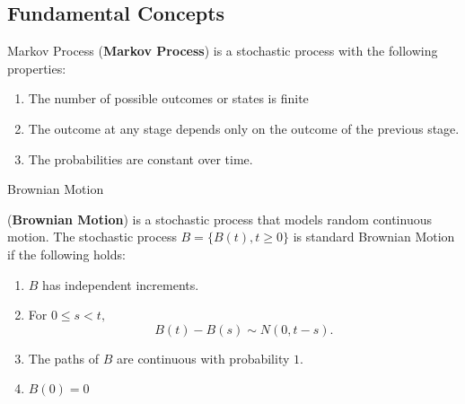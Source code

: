 \subsection{Fundamental Concepts}
%
\begin{frame}{Markov Process}
(\textbf{Markov Process}) is a stochastic process with the following properties: 
\begin{enumerate}
\item The number of possible outcomes or states is finite
\item The outcome at any stage depends only on the outcome of the previous stage.
\item The probabilities are constant over time.   
\end{enumerate}
\end{frame}


\begin{frame}{Brownian Motion}
\begin{definition}(\textbf{Brownian Motion}) is a stochastic process that models random continuous motion. The stochastic process $B=\{B(t), t\geq 0\}$ is standard Brownian Motion if the following holds:
\begin{enumerate}
\item $B$ has independent increments.
\item For $0 \leq s < t,$ $$B(t)-B(s) \sim N(0,t-s).$$
\item The paths of $B$ are continuous with probability $1$.
\item $B(0)=0$ 
\end{enumerate}
\end{definition}
\end{frame}

\begin{frame}

  \cite{doi:10.1137/S0036144500378302}
\end{frame}

